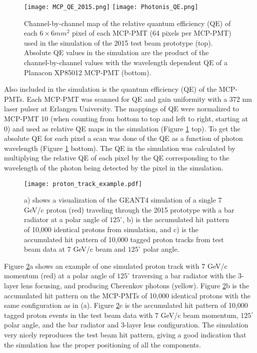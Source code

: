 \begin{figure}[!htb]
	\centering
	\texttt{[image: MCP\_QE\_2015.png]}
	\texttt{[image: Photonis\_QE.png]}
	\caption{Channel-by-channel map of the relative quantum efficiency (QE) of each $6\times6\unit{mm}^2$ pixel of each MCP-PMT (64 pixels per MCP-PMT) used in the simulation of the 2015 test beam prototype (top). Absolute QE values in the simulation are the product of the channel-by-channel values with the wavelength dependent QE of a Planacon XP85012 MCP-PMT (bottom).}
	\label{fig:quantum_efficiency}
\end{figure}

Also included in the simulation is the quantum efficiency (QE) of the MCP-PMTs. Each MCP-PMT was scanned for QE and gain uniformity with a 372 nm laser pulser at Erlangen University. The mappings of QE were normalized to MCP-PMT 10 (when counting from bottom to top and left to right, starting at 0) and used as relative QE maps in the simulation (Figure \ref{fig:quantum_efficiency} top). To get the absolute QE for each pixel a scan was done of the QE as a function of photon wavelength (Figure \ref{fig:quantum_efficiency} bottom). The QE in the simulation was calculated by multiplying the relative QE of each pixel by the QE corresponding to the wavelength of the photon being detected by the pixel in the simulation.

\begin{figure}[!htb]
	\centering
	\texttt{[image: proton\_track\_example.pdf]}
	\caption{a) shows a visualization of the GEANT4 simulation of a single 7 GeV/c proton (red) traveling through the 2015 prototype with a bar radiator at a polar angle of $125^{\circ}$, b) is the accumulated hit pattern of 10,000 identical protons from simulation, and c) is the accumulated hit pattern of 10,000 tagged proton tracks from test beam data at 7 GeV/c beam and $125^{\circ}$ polar angle.}
	\label{fig:proton_track_example}
\end{figure}

Figure \ref{fig:proton_track_example}a shows an example of one simulated proton track with 7 GeV/c momentum (red) at a polar angle of $125^{\circ}$ traversing a bar radiator with the 3-layer lens focusing, and producing Cherenkov photons (yellow). Figure \ref{fig:proton_track_example}b is the accumulated hit pattern on the MCP-PMTs of 10,000 identical protons with the same configuration as in (a). Figure \ref{fig:proton_track_example}c is the accumulated hit pattern of 10,000 tagged proton events in the test beam data with 7 GeV/c beam momentum, $125^{\circ}$ polar angle, and the bar radiator and 3-layer lens configuration. The simulation very nicely reproduces the test beam hit pattern, giving a good indication that the simulation has the proper positioning of all the components.


